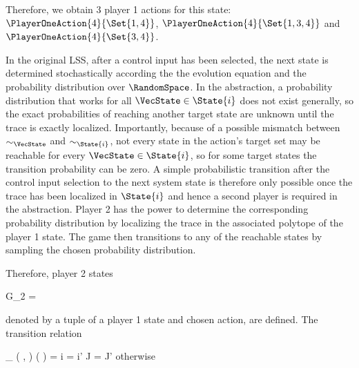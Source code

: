     Therefore, we obtain 3 player 1 actions for this state: $\PlayerOneAction{4}{\Set{1, 4}}$, $\PlayerOneAction{4}{\Set{1, 3, 4}}$ and $\PlayerOneAction{4}{\Set{3, 4}}$.

\stopsubsection


\startsubsection[title={Player 2},reference=sec:abstraction-graph-playertwo]

    In the original LSS, after a control input has been selected, the next state is determined stochastically according the the evolution equation and the probability distribution over $\RandomSpace$.
    In the abstraction, a probability distribution that works for all $\VecState \in \State{i}$ does not exist generally, so the exact probabilities of reaching another target state are unknown until the trace is exactly localized.
    Importantly, because of a possible mismatch between $\sim_\VecState$ and $\sim_{\State{i}}$, not every state in the action's target set may be reachable for every $\VecState \in \State{i}$, so for some target states the transition probability can be zero.
    A simple probabilistic transition after the control input selection to the next system state is therefore only possible once the trace has been localized in $\State{i}$ and hence a second player is required in the abstraction.
    Player 2 has the power to determine the corresponding probability distribution by localizing the trace in the associated polytope of the player 1 state.
    The game then transitions to any of the reachable states by sampling the chosen probability distribution.

    Therefore, player 2 states

    \startformula
        G_2 =  \EndComma
    \stopformula

    denoted by a tuple of a player 1 state and chosen action, are defined.
    The transition relation

    \startformula
        \Transition_\GameGraph
            \Big( ,  \Big)
            \Big(  \Big)
        = \startmathcases
            \MC \startgathered
                    \NC \StartIf i = i' \MidAnd J = J'
                    \NR
                    \NC \quad \MidAnd {} \neq \emptyset
                    \NR
                \stopgathered
            \NR
            \NC otherwise
            \NR
        \stopmathcases
    \stopformula

